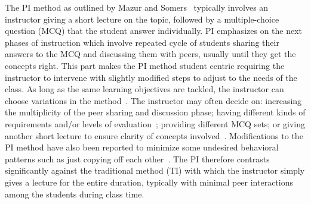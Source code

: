 \documentclass[twocolumn,secnumarabic,amssymb, nobibnotes, aps, prd]{revtex4-2}
\begin{document}
    The PI method as outlined by Mazur and Somers~\cite{mazur1997peer} typically involves an instructor giving a short lecture on the topic, followed by a multiple-choice question (MCQ) that the student answer individually.
    PI emphasizes on the next phases of instruction which involve repeated cycle of students sharing their answers to the MCQ and discussing them with peers, usually until they get the concepts right.
    This part makes the PI method student centric requiring the instructor to intervene with slightly modified steps to adjust to the needs of the class.
    As long as the same learning objectives are tackled, the instructor can choose variations in the method~\cite{smith2009peer}.
    The instructor may often decide on: increasing the multiplicity of the peer sharing and discussion phase; having different kinds of requirements and/or levels of evaluation~\cite{crouch2001peer}; providing different MCQ sets; or giving another short lecture to ensure clarity of concepts involved~\cite{lasry2008peer}.
    Modifications to the PI method have also been reported to minimize some undesired behavioral patterns such as just copying off each other~\cite{smith2009peer}.
    The PI therefore contrasts significantly against the traditional method (TI) with which the instructor simply gives a lecture for the entire duration, typically with minimal peer interactions among the students during class time.
    

%
    
\end{document}
